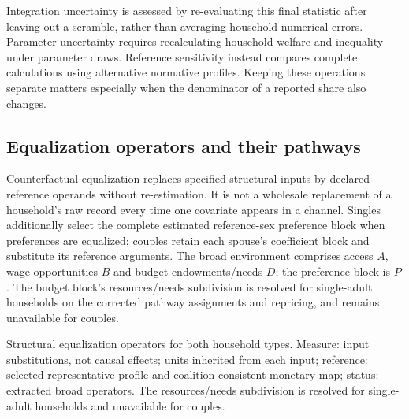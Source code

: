 \documentclass[11pt,a4paper]{article}
\begin{document}
Integration uncertainty is assessed by re-evaluating this final statistic after leaving out a scramble, rather than averaging household numerical errors. Parameter uncertainty requires recalculating household welfare and inequality under parameter draws. Reference sensitivity instead compares complete calculations using alternative normative profiles. Keeping these operations separate matters especially when the denominator of a reported share also changes.

\subsection{Equalization operators and their pathways}\label{equalization-operators-and-their-pathways}

Counterfactual equalization replaces specified structural inputs by declared reference operands without re-estimation. It is not a wholesale replacement of a household's raw record every time one covariate appears in a channel. Singles additionally select the complete estimated reference-sex preference block when preferences are equalized; couples retain each spouse's coefficient block and substitute its reference arguments. The broad environment comprises access \(A\), wage opportunities \(B\) and budget endowments/needs \(D\); the preference block is \(P\). The budget block's resources/needs subdivision is resolved for single-adult households on the corrected pathway assignments and repricing, and remains unavailable for couples.

Structural equalization operators for both household types. Measure: input substitutions, not causal effects; units inherited from each input; reference: selected representative profile and coalition-consistent monetary map; status: extracted broad operators. The resources/needs subdivision is resolved for single-adult households and unavailable for couples.
\end{document}
